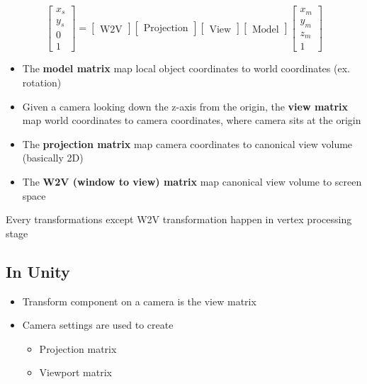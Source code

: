   \begin{equation}
    \begin{bmatrix}
      x_{s} \\
      y_{s} \\
      0 \\
      1
    \end{bmatrix}
    =
    \begin{bmatrix}
      \text{W2V}
    \end{bmatrix}
    \begin{bmatrix}
      \text{Projection}
    \end{bmatrix}
    \begin{bmatrix}
      \text{View}
    \end{bmatrix}
    \begin{bmatrix}
      \text{Model}
    \end{bmatrix}
    \begin{bmatrix}
      x_{m} \\
      y_{m} \\
      z_{m} \\
      1
    \end{bmatrix}
  \end{equation}

  \begin{itemize}
    \item The \textbf{model matrix} map local object coordinates to
    world coordinates (ex. rotation)
    \item Given a camera looking down the z-axis from the origin,
    the \textbf{view matrix} map world coordinates to camera coordinates,
    where camera sits at the origin
    \item The \textbf{projection matrix} map camera coordinates to canonical
    view volume (basically 2D)
    \item The \textbf{W2V (window to view) matrix} map canonical view volume
    to screen space
  \end{itemize}

  Every transformations except W2V transformation happen in vertex
  processing stage

  \subsection{In Unity}

    \begin{itemize}
      \item Transform component on a camera is the view matrix
      \item Camera settings are used to create
      \begin{itemize}
        \item Projection matrix
        \item Viewport matrix
      \end{itemize}
    \end{itemize}


